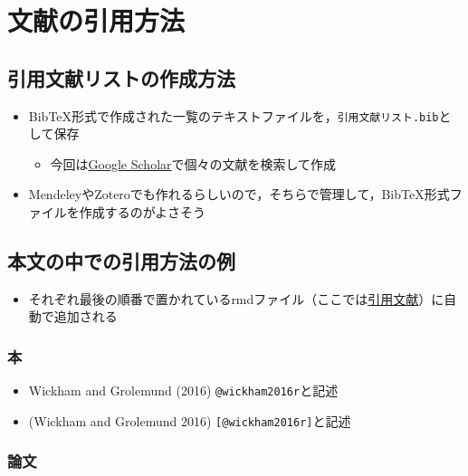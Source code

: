 \documentclass[xelatex,ja=standard]{bxjsbook}
\providecommand{\tightlist}{%
  \setlength{\itemsep}{0pt}\setlength{\parskip}{0pt}}
\begin{document}
\hypertarget{bunken}{%
\section{文献の引用方法}\label{bunken}}

\hypertarget{bunken_list}{%
\subsection{引用文献リストの作成方法}\label{bunken_list}}

\begin{itemize}
\tightlist
\item
  BibTeX形式で作成された一覧のテキストファイルを，\texttt{引用文献リスト.bib}として保存

  \begin{itemize}
  \tightlist
  \item
    今回は\href{https://scholar.google.co.jp/}{Google Scholar}で個々の文献を検索して作成
  \end{itemize}
\item
  MendeleyやZoteroでも作れるらしいので，そちらで管理して，BibTeX形式ファイルを作成するのがよさそう
\end{itemize}

\hypertarget{bunken_example}{%
\subsection{本文の中での引用方法の例}\label{bunken_example}}

\begin{itemize}
\tightlist
\item
  それぞれ最後の順番で置かれているrmdファイル（ここでは\protect\hyperlink{reference}{引用文献}）に自動で追加される
\end{itemize}

\hypertarget{ux672c}{%
\subsubsection*{本}\label{ux672c}}

\begin{itemize}
\tightlist
\item
  Wickham and Grolemund (2016) \texttt{@wickham2016r}と記述
\item
  (Wickham and Grolemund 2016) \texttt{{[}@wickham2016r{]}}と記述
\end{itemize}

\hypertarget{ux8ad6ux6587}{%
\subsubsection*{論文}\label{ux8ad6ux6587}}
\end{document}
